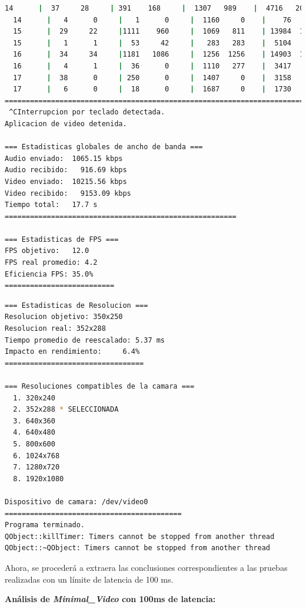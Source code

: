 \begin{lstlisting}[language=bash,basicstyle=\ttfamily\scriptsize]
  14      |  37     28     | 391    168     |  1307   989    |  4716   2028   |  28     68
  14      |   4      0     |   1      0     |  1160     0    |    76      0   |  17     68
  15      |  29     22     |1111    960     |  1069   811    | 13984  12078   |  31     67
  15      |   1      1     |  53     42     |   283   283    |  5104   4062   |  25     69
  16      |  34     34     |1181   1086     |  1256  1256    | 14903  13703   |  34     72
  16      |   4      1     |  36      0     |  1110   277    |  3417      0   |  50     72
  17      |  38      0     | 250      0     |  1407     0    |  3158      0   |  36     70
  17      |   6      0     |  18      0     |  1687     0    |  1730      0   |  25     68
============================================================================================
 ^CInterrupcion por teclado detectada.
Aplicacion de video detenida.

=== Estadisticas globales de ancho de banda ===
Audio enviado:	1065.15 kbps
Audio recibido:   916.69 kbps
Video enviado:	10215.56 kbps
Video recibido:   9153.09 kbps
Tiempo total: 	17.7 s
=======================================================

=== Estadisticas de FPS ===
FPS objetivo: 	12.0
FPS real promedio: 4.2
Eficiencia FPS:	35.0%
==========================
\end{lstlisting}

\begin{lstlisting}[language=bash,basicstyle=\ttfamily\scriptsize]
=== Estadisticas de Resolucion ===
Resolucion objetivo: 350x250
Resolucion real: 352x288
Tiempo promedio de reescalado: 5.37 ms
Impacto en rendimiento:    	6.4%
=================================

=== Resoluciones compatibles de la camara ===
  1. 320x240
  2. 352x288 * SELECCIONADA
  3. 640x360
  4. 640x480
  5. 800x600
  6. 1024x768
  7. 1280x720
  8. 1920x1080

Dispositivo de camara: /dev/video0
==========================================
Programa terminado.
QObject::killTimer: Timers cannot be stopped from another thread
QObject::~QObject: Timers cannot be stopped from another thread
\end{lstlisting}

\newpage

Ahora, se procederá a extraera las conclusiones correspondientes a las pruebas realizadas con un límite de latencia de 100 ms.
\vspace{\baselineskip}

\textbf{Análisis de \textit{Minimal\_Video} con 100ms de latencia:}
\vspace{\baselineskip}

